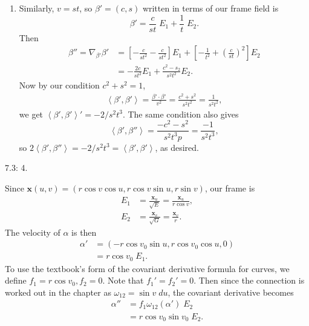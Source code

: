 \documentclass[10pt]{report}
\begin{document}
\begin{enumerate}
	\item Similarly, $v=st$, so $\beta' = (c,s)$ written in terms of our frame field is
		\[
		\beta' = \frac{c}{st} \;E_1 + \frac{1}{t} \;E_2.
		\] 
		Then
		\begin{align*}
			\beta'' = \nabla_{\beta'}\beta' &= \left[ -\frac{c}{st^2} -\frac{c}{st^2}  \right]E_1 + \left[ -\frac{1}{t^2} +\left( \frac{c}{st}  \right)^2 \right]E_2 \\
							&= -\frac{2c}{st^2} E_1 + \frac{c^2-s_2}{s^2t^2} E_2.
		\end{align*}
		Now by our condition $c^2+s^2=1$,
		\begin{align*}
			\left\langle \beta',\beta' \right\rangle = \frac{\beta'\cdot \beta'}{v^2} = \frac{c^2+s^2}{s^2t^2} = \frac{1}{s^2t^2} ,
		\end{align*} we get $\left\langle \beta',\beta' \right\rangle' = -2/s^2t^3$. The same condition also gives
		\[
		\left\langle \beta',\beta'' \right\rangle = \frac{-c^2-s^2}{s^2t^3p} = \frac{-1}{s^2t^3} ,
		\] so $2\left\langle \beta',\beta'' \right\rangle=-2/s^2t^3=\left\langle \beta',\beta' \right\rangle$, as desired.
\end{enumerate}

\begin{exer}[]
7.3: 4.
\end{exer}
	Since $\mathbf{x}(u,v) = \left( r\cos v \cos u,r \cos v \sin u, r \sin v \right)$, our frame is
		\begin{align*}
			E_1 &= \frac{\mathbf{x}_{u}}{\sqrt{E}} = \frac{\mathbf{x}_{u}}{r \cos v} ,\\
			E_2 &= \frac{\mathbf{x}_{v}}{\sqrt{G} } = \frac{\mathbf{x}_{v}}{r} .
		\end{align*}
		The velocity of $\alpha$ is then
		\begin{align*}
			\alpha' &= \left( -r \cos v_0 \sin u, r \cos v_0 \cos u,0 \right) \\
				&= r \cos v_0 \;E_1.
		\end{align*}
		To use the textbook's form of the covariant derivative formula for curves, we define $f_1 = r \cos v_0, f_2=0$. Note that $f_1'=f_2'=0$. Then since the connection is worked out in the chapter as $\omega_{12}= \sin v \; du$, the covariant derivative becomes
		\begin{align*}
			\alpha'' &= f_1\omega_{12}(\alpha') \; E_2 \\
				 &= r \cos v_0 \sin v_0 \; E_2.
		\end{align*}
\end{document}
